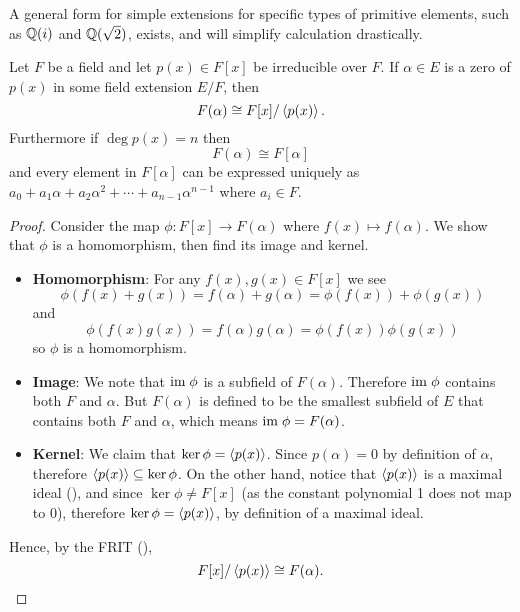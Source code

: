 A general form for simple extensions for specific types of primitive elements, such as $\mathbb{Q}(i)$ and $\mathbb{Q}(\sqrt 2)$, exists, and will simplify calculation drastically.

\begin{theorem}\label{thrm-simple-extension-isomorphism}
    Let $F$ be a field and let $p(x) \in F[x]$ be irreducible over $F$. If $\alpha \in E$ is a zero of $p(x)$ in some field extension $E/F$, then
    \[
        F(\alpha) \cong F[x] / \left\langle p(x)\right\rangle.
    \]
    Furthermore if $\deg p(x) = n$ then
    \[
        F(\alpha) \cong F[\alpha]
    \]
    and every element in $F[\alpha]$ can be expressed uniquely as $a_0 + a_1\alpha + a_2\alpha^2 + \cdots + a_{n-1}\alpha^{n-1}$ where $a_i \in F$.
\end{theorem}
\begin{proof}
    Consider the map $\phi: F[x] \to F(\alpha)$ where $f(x) \mapsto f(\alpha)$. We show that $\phi$ is a homomorphism, then find its image and kernel.
    \begin{itemize}
        \item \textbf{Homomorphism}: For any $f(x), g(x) \in F[x]$ we see
        \[
            \phi(f(x) + g(x)) = f(\alpha) + g(\alpha) = \phi(f(x)) + \phi(g(x))
        \]
        and
        \[
            \phi(f(x)g(x)) = f(\alpha)g(\alpha) = \phi(f(x))\phi(g(x))
        \]
        so $\phi$ is a homomorphism.

        \item \textbf{Image}: We note that $\mathrm{im}\;\phi$ is a subfield of $F(\alpha)$. Therefore $\mathrm{im}\;\phi$ contains both $F$ and $\alpha$. But $F(\alpha)$ is defined to be the smallest subfield of $E$ that contains both $F$ and $\alpha$, which means $\mathrm{im}\;\phi = F(\alpha)$.

        \item \textbf{Kernel}: We claim that $\ker\phi = \left\langle p(x)\right\rangle$. Since $p(\alpha) = 0$ by definition of $\alpha$, therefore $\left\langle p(x)\right\rangle \subseteq \ker\phi$. On the other hand, notice that $\left\langle p(x)\right\rangle$ is a maximal ideal (), and since $\ker\phi \neq F[x]$ (as the constant polynomial 1 does not map to 0), therefore $\ker\phi = \left\langle p(x)\right\rangle$, by definition of a maximal ideal.
    \end{itemize}

    Hence, by the FRIT (),
    \[
        F[x]/\left\langle p(x)\right\rangle \cong F(\alpha).
    \]


\end{proof}

